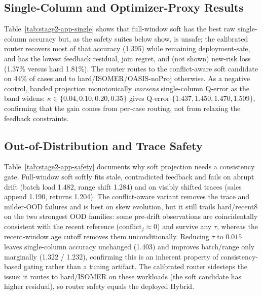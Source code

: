 \documentclass[runningheads]{llncs}
\begin{document}
\subsection{Single-Column and Optimizer-Proxy Results}



Table~\ref{tab:stage2-app-single} shows that full-window soft has the best raw
single-column accuracy but, as the safety suites below show, is unsafe; the
calibrated router recovers most of that accuracy (1.395) while remaining
deployment-safe, and has the lowest feedback residual, join regret, and (not
shown) new-risk loss (1.37\% versus hard 1.81\%). The router routes to the
conflict-aware soft candidate on 44\% of cases and to hard/ISOMER/OASIS-noProj
otherwise. As a negative control, banded projection monotonically \emph{worsens}
single-column Q-error as the band widens: $\kappa\in\{0.04,0.10,0.20,0.35\}$
gives Q-error $\{1.437,1.450,1.470,1.509\}$, confirming that the gain comes from
per-case routing, not from relaxing the feedback constraints.

\subsection{Out-of-Distribution and Trace Safety}



Table~\ref{tab:stage2-app-safety} documents why soft projection needs a
consistency gate. Full-window soft softly fits stale, contradicted feedback and
fails on abrupt drift (batch load 1.482, range shift 1.284) and on visibly
shifted traces (sales append 1.190, returns 1.204). The conflict-aware variant
removes the trace and milder-OOD failures and is best on skew evolution, but it
still trails hard/recent8 on the two strongest OOD families: some pre-drift
observations are coincidentally consistent with the recent reference
($\text{conflict}_j\approx 0$) and survive any $\tau$, whereas the recent-window
age cutoff removes them unconditionally. Reducing $\tau$ to $0.015$ leaves
single-column accuracy unchanged (1.403) and improves batch/range only
marginally (1.322 / 1.232), confirming this is an inherent property of
consistency-based gating rather than a tuning artifact. The calibrated router
sidesteps the issue: it routes to hard/ISOMER on these workloads (the soft
candidate has higher residual), so router safety equals the deployed Hybrid.
\end{document}
